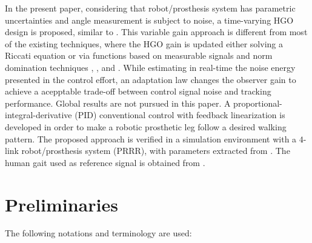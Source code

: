 \documentclass[letterpaper, 10 pt, journal, twocolumn]{IEEEtran}  %
\theoremstyle{plain}
\theoremstyle{definition}
\theoremstyle{remark}
\begin{document}
In the present paper, considering that robot/prosthesis system has parametric uncertainties and angle measurement is subject to noise, a time-varying HGO design is proposed, similar to \cite{POH:2011}. 
This variable gain approach is different from most of the existing techniques,
where the HGO gain is updated either solving a Riccati equation
\cite{P:01}\cite{P:07}\cite{GAL:06} or via 
functions based on measurable signals and norm
domination techniques \cite{LL:05}, \cite{P:07}, \cite{APA:09} and \cite{POH:2011}. While estimating in real-time the noise energy presented in the control effort, an adaptation law changes the observer gain to achieve a acepptable  trade-off between control signal noise and tracking performance. Global results are not pursued in this paper.
A proportional-integral-derivative (PID) conventional control with feedback linearization is developed in order to make a robotic prosthetic leg follow a desired walking pattern. 
%
The proposed approach is verified in a simulation environment with a $4$-link robot/prosthesis system (PRRR), with parameters extracted from \cite{Richter2015}. The human gait used as reference signal is obtained from \cite{Schwartz2008}.


\section{Preliminaries}


The following notations and terminology are used:%



\end{document}
